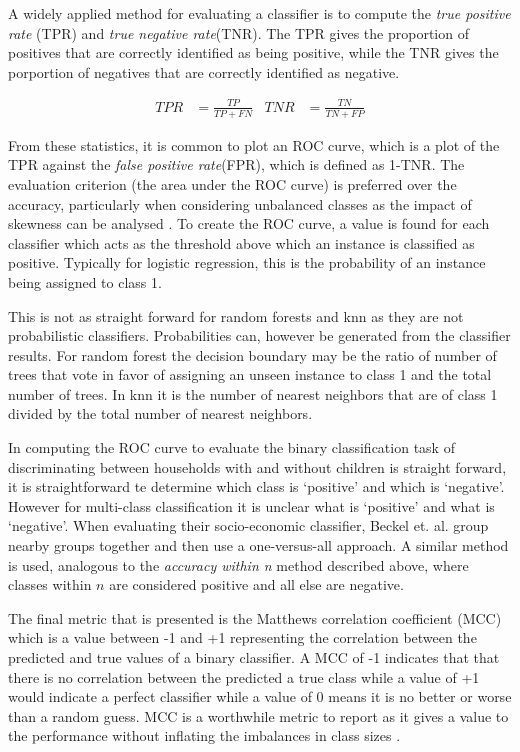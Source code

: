 A widely applied method for evaluating a classifier is to compute the \textit{true positive rate} (TPR) and \textit{true negative rate}(TNR). The TPR gives the proportion of positives that are correctly identified as being positive, while the TNR gives the porportion of negatives that are correctly identified as negative.

\begin{align*}
TPR&=\frac{TP}{TP+FN}   &   TNR&=\frac{TN}{TN+FP}   
\end{align*}

From these statistics, it is common to plot an ROC curve, which is a plot of the TPR against the \textit{false positive rate}(FPR), which is defined as 1-TNR. The evaluation criterion (the area under the ROC curve) is preferred over the accuracy, particularly when considering unbalanced classes as the impact of skewness can be analysed \cite{Waegeman}. To create the ROC curve, a value is found for each classifier which acts as the threshold above which an instance is classified as positive. Typically for logistic regression, this is the probability of an instance being assigned to class 1.

This is not as straight forward for random forests and knn as they are not probabilistic classifiers. Probabilities can, however be generated from the classifier results. For random forest the decision boundary may be the ratio of number of trees that vote in favor of assigning an unseen instance to class 1 and the total number of trees. In knn it is the number of nearest neighbors that are of class 1 divided by the total number of nearest neighbors.

In computing the ROC curve to evaluate the binary classification task of discriminating between households with and without children is straight forward, it is straightforward te determine which class is `positive' and which is `negative'. However for multi-class classification it is unclear what is `positive' and what is `negative'. When evaluating their socio-economic classifier, Beckel et. al. group nearby groups together and then use a one-versus-all approach\cite{Beckel_2,Beckel_3}. A similar method is used, analogous to the \textit{accuracy within n} method described above, where classes within $n$ are considered positive and all else are negative.

The final metric that is presented is the Matthews correlation coefficient (MCC) which is a value between -1 and +1 representing the correlation between the predicted and true values of a binary classifier. A MCC of -1 indicates that that there is no correlation between the predicted a true class while a value of +1 would indicate a perfect classifier while a value of 0 means it is no better or worse than a random guess. MCC is a worthwhile metric to report as it gives a value to the performance without inflating the imbalances in class sizes \cite{Powers}. 

